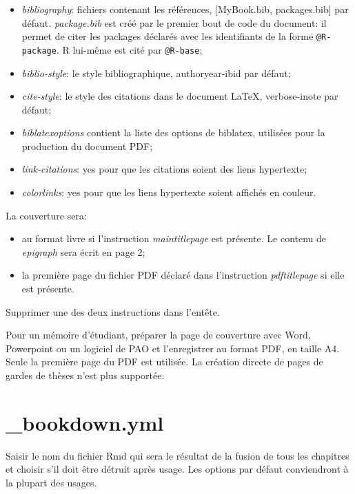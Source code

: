 \documentclass[
  11pt,
  american,
  a4paper,
  extrafontsizes,onecolumn,openright
  ]{memoir}
\providecommand{\tightlist}{%
  \setlength{\itemsep}{0pt}\setlength{\parskip}{0pt}}
\begin{document}
\begin{itemize}
\tightlist
\item
  \emph{bibliography}: fichiers contenant les références, {[}MyBook.bib, packages.bib{]} par défaut. \emph{package.bib} est créé par le premier bout de code du document: il permet de citer les packages déclarés avec les identifiants de la forme \texttt{@R-package}. R lui-même est cité par \texttt{@R-base};
\item
  \emph{biblio-style}: le style bibliographique, authoryear-ibid par défaut;
\item
  \emph{cite-style}: le style des citations dans le document LaTeX, verbose-inote par défaut;
\item
  \emph{biblatexoptions} contient la liste des options de biblatex, utilisées pour la production du document PDF;
\item
  \emph{link-citations}: yes pour que les citations soient des liens hypertexte;
\item
  \emph{colorlinks}: yes pour que les liens hypertexte soient affichés en couleur.
\end{itemize}

La couverture sera:

\begin{itemize}
\tightlist
\item
  au format livre si l'instruction \emph{maintitlepage} est présente. Le contenu de \emph{epigraph} sera écrit en page 2;
\item
  la première page du fichier PDF déclaré dans l'instruction \emph{pdftitlepage} si elle est présente.
\end{itemize}

Supprimer une des deux instructions dans l'entête.

Pour un mémoire d'étudiant, préparer la page de couverture avec Word, Powerpoint ou un logiciel de PAO et l'enregistrer au format PDF, en taille A4.
Seule la première page du PDF est utilisée.
La création directe de pages de gardes de thèses n'est plus supportée.

\hypertarget{bookdown.yml}{%
\section{\_bookdown.yml}\label{bookdown.yml}}

Saisir le nom du fichier Rmd qui sera le résultat de la fusion de tous les chapitres et choisir s'il doit être détruit après usage.
Les options par défaut conviendront à la plupart des usages.
\end{document}
